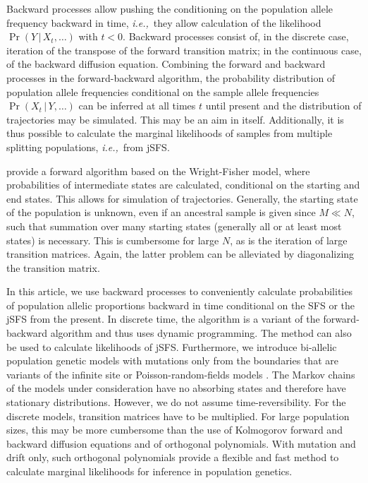\documentclass[preprint]{elsarticle}
\newcommand\given{{\,|\,}}
\newcommand\ie{{\it i.e.,}}
\begin{document}
Backward processes allow pushing the conditioning on the population allele frequency backward in time, \ie\ they allow calculation of the likelihood $\Pr(Y\given X_t, \dots)$ with $t<0$. Backward processes consist of, in the discrete case, iteration of the transpose of the forward transition matrix; in the continuous case, of the backward diffusion equation. Combining the forward and backward processes in the forward-backward algorithm, the probability distribution of population allele frequencies conditional on the sample allele frequencies $\Pr(X_t\given Y,\dots)$ can be inferred at all times $t$ until present and the distribution of trajectories may be simulated. This may be an aim in itself. Additionally, it is thus possible to calculate the marginal likelihoods of samples from multiple splitting populations, \ie\ from jSFS.

\citet{Zhao13} provide a forward algorithm based on the Wright-Fisher model, where probabilities of intermediate states are calculated, conditional on the starting and end states. This allows for simulation of trajectories. Generally, the starting state of the population is unknown, even if an ancestral sample is given since $M \ll N$, such that summation over many starting states (generally all or at least most states) is necessary. This is cumbersome for large $N$, as is the iteration of large transition matrices. Again, the latter problem can be alleviated by diagonalizing the transition matrix. 

In this article, we use backward processes to conveniently calculate probabilities of population allelic proportions backward in time conditional on the SFS or the jSFS from the present. In discrete time, the algorithm is a variant of the forward-backward algorithm and thus uses dynamic programming. The method can also be used to calculate likelihoods of jSFS. Furthermore, we introduce bi-allelic population genetic models with mutations only from the boundaries that are variants of the infinite site or Poisson-random-fields models \citep{Kimu69,Sawy92}. The Markov chains of the models under consideration have no absorbing states and therefore have stationary distributions.  However, we do not assume time-reversibility. For the discrete models, transition matrices have to be multiplied. For large population sizes, this may be more cumbersome than the use of Kolmogorov forward and backward diffusion equations and of orthogonal polynomials. With mutation and drift only, such orthogonal polynomials provide a flexible and fast method to calculate marginal likelihoods for inference in population genetics.
\end{document}
